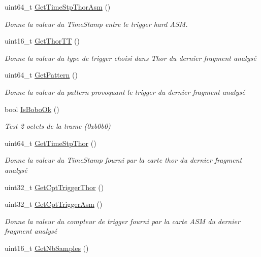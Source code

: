 \begin{DoxyCompactItemize}
uint64\+\_\+t \hyperlink{class_decode_frame_a69475a7cd412ac056bc97f16768b470b}{Get\+Time\+Stp\+Thor\+Asm} ()
\begin{DoxyCompactList}\small\item\em Donne la valeur du Time\+Stamp entre le trigger hard A\+SM. \end{DoxyCompactList}\item 
uint16\+\_\+t \hyperlink{class_decode_frame_a5fafd547d67ae2f38635174a402b5824}{Get\+Thor\+TT} ()
\begin{DoxyCompactList}\small\item\em Donne la valeur du type de trigger choisi dans Thor du dernier fragment analysé \end{DoxyCompactList}\item 
uint64\+\_\+t \hyperlink{class_decode_frame_a036d1c2974dc06c43ee945b7586a14d6}{Get\+Pattern} ()
\begin{DoxyCompactList}\small\item\em Donne la valeur du pattern provoquant le trigger du dernier fragment analysé \end{DoxyCompactList}\item 
bool \hyperlink{class_decode_frame_a0161fec474851adebcb4494c8773242e}{Is\+Bobo\+Ok} ()
\begin{DoxyCompactList}\small\item\em Test 2 octets de la trame (0xb0b0) \end{DoxyCompactList}\item 
uint64\+\_\+t \hyperlink{class_decode_frame_a81f93958ad2e294cb165ca1fda16e6d5}{Get\+Time\+Stp\+Thor} ()
\begin{DoxyCompactList}\small\item\em Donne la valeur du Time\+Stamp fourni par la carte thor du dernier fragment analysé \end{DoxyCompactList}\item 
uint32\+\_\+t \hyperlink{class_decode_frame_a582eb89fe03a3076f394776330a6c037}{Get\+Cpt\+Trigger\+Thor} ()
\item 
uint32\+\_\+t \hyperlink{class_decode_frame_ab9c8da95989c9d1d3cb7bb28d2ac5811}{Get\+Cpt\+Trigger\+Asm} ()
\begin{DoxyCompactList}\small\item\em Donne la valeur du compteur de trigger fourni par la carte A\+SM du dernier fragment analysé \end{DoxyCompactList}\item 
uint16\+\_\+t \hyperlink{class_decode_frame_a97752547e2e402603dccf279928cd347}{Get\+Nb\+Samples} ()

\end{DoxyCompactItemize}

